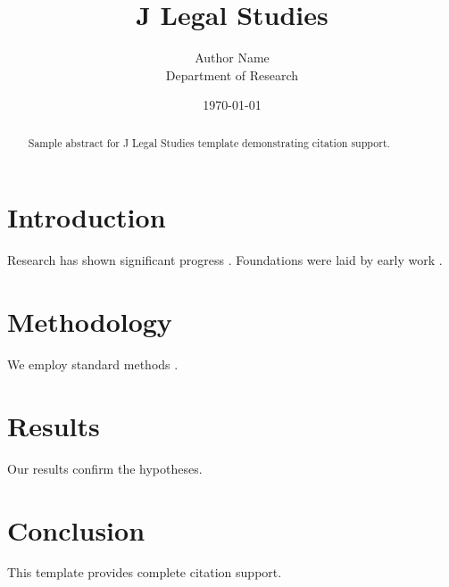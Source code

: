 \documentclass{oup}
\title{J Legal Studies}
\author{Author Name \\ \small Department of Research}
\date{\today}
\begin{document}
\maketitle

\begin{abstract}
Sample abstract for J Legal Studies template demonstrating citation support.
\end{abstract}

\section{Introduction}
Research has shown significant progress \citep{einstein1905}. Foundations were laid by early work \citep{turing1950}.

\section{Methodology}
We employ standard methods \citep{knuth1984}.

\section{Results}
Our results confirm the hypotheses.

\section{Conclusion}
This template provides complete citation support.



\end{document}
